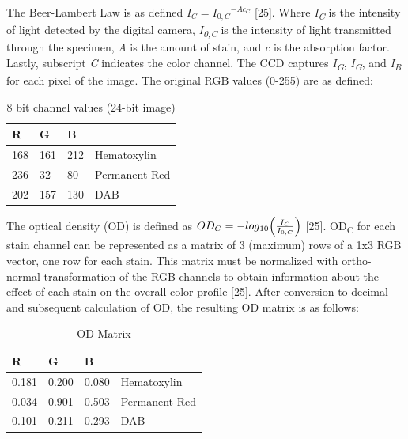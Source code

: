 \documentclass[12pt]{article}
\begin{document}
The Beer-Lambert Law is as defined \begin{math}I_{C} = {I_{0,C}}^{-Ac_{C}}\end{math} [25].
Where \textit{I\textsubscript{C}} is the intensity of light detected by the digital camera, \textit{I\textsubscript{0,C}} is the intensity of light transmitted through the specimen, \textit{A} is the amount of stain, and \textit{c} is the absorption factor. Lastly, subscript \textit{C} indicates the color channel. The CCD captures \textit{I\textsubscript{G}}, \textit{I\textsubscript{G}}, and \textit{I\textsubscript{B}} for each pixel of the image. The original RGB values (0-255) are as defined:



\begin{table}[H]
\centering
\caption{8 bit channel values (24-bit image)}
\label{color channel values}
\begin{tabular}{|l|l|l|l}
\cline{1-3}
R   & G   & B   &                                    \\ \hline
168 & 161 & 212 & \multicolumn{1}{l|}{Hematoxylin}   \\ \hline
236 & 32  & 80  & \multicolumn{1}{l|}{Permanent Red} \\ \hline
202 & 157 & 130 & \multicolumn{1}{l|}{DAB}           \\ \hline
\end{tabular}
\end{table}


\noindent The optical density (OD) is defined as \begin{math}OD_C = -log\textsubscript{10}\Big(\frac{I_C}{I_{0,C}}\Big) \end{math} [25]. OD\textsubscript{C} for each stain channel can be represented as a matrix of 3 (maximum) rows of a 1x3 RGB vector, one row for each stain. This matrix must be normalized with ortho-normal transformation of the RGB channels to obtain information about the effect of each stain on the overall color profile [25]. After conversion to decimal and subsequent calculation of OD, the resulting OD matrix is as follows:


\begin{table}[H]
\centering
\caption{OD Matrix}
\label{OD matrix}
\begin{tabular}{|l|l|l|l}
\cline{1-3}
R   & G   & B   &                                    \\ \hline
0.181 & 0.200 & 0.080 & \multicolumn{1}{l|}{Hematoxylin}   \\ \hline
0.034 & 0.901  & 0.503  & \multicolumn{1}{l|}{Permanent Red} \\ \hline
0.101 & 0.211 & 0.293 & \multicolumn{1}{l|}{DAB}           \\ \hline
\end{tabular}
\end{table}
\end{document}
